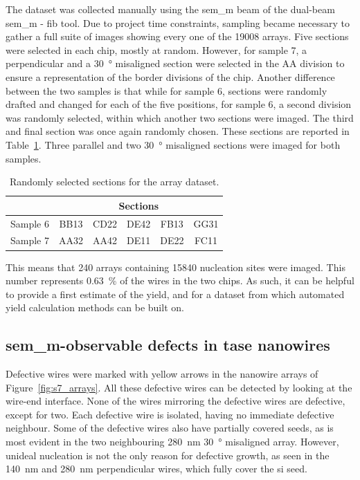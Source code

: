 The dataset was collected manually using the \acs{sem_m} beam of the dual-beam \acs{sem_m} - \acs{fib} tool. Due to project time constraints, sampling became necessary to gather a full suite of images showing every one of the \num{19008} arrays. Five sections were selected in each chip, mostly at random. However, for sample 7, a perpendicular and a \qty{30}{\degree} misaligned section were selected in the AA division to ensure a representation of the border divisions of the chip. Another difference between the two samples is that while for sample 6, sections were randomly drafted and changed for each of the five positions, for sample 6, a second division was randomly selected, within which another two sections were imaged. The third and final section was once again randomly chosen. These sections are reported in Table~\ref{tab:dataset_sections}. Three parallel and two \qty{30}{\degree} misaligned sections were imaged for both samples.

\begin{table}
    \centering
    \caption{Randomly selected sections for the array dataset.}
    \begin{tabular}{c|c c c c c}
         & \multicolumn{5}{c}{Sections} \\ \hline
        Sample 6 & BB13 & CD22 & DE42 & FB13 & GG31 \\
        Sample 7 & AA32 & AA42 & DE11 & DE22 & FC11 \\ \hline \hline
    \end{tabular}
    \label{tab:dataset_sections}
\end{table}

This means that 240 arrays containing 15840 nucleation sites were imaged. This number represents \qty{0.63}{\percent} of the wires in the two chips. As such, it can be helpful to provide a first estimate of the yield, and for a dataset from which automated yield calculation methods can be built on.

\subsection{\texorpdfstring{\acs{sem_m}-observable defects in \acs{tase} nanowires}{SEM observable defects in TASE nanowires}}

Defective wires were marked with yellow arrows in the nanowire arrays of Figure~\ref{fig:s7_arrays}. All these defective wires can be detected by looking at the wire-end interface. None of the wires mirroring the defective wires are defective, except for two. Each defective wire is isolated, having no immediate defective neighbour. Some of the defective wires also have partially covered seeds, as is most evident in the two neighbouring \qty{280}{\nano\metre} \qty{30}{\degree} misaligned array. However, unideal nucleation is not the only reason for defective growth, as seen in the \qty{140}{\nano\metre} and \qty{280}{\nano\metre} perpendicular wires, which fully cover the \acl{si} seed.

